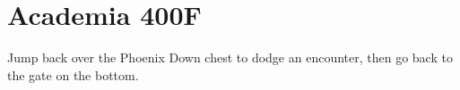 \chapter{Academia 400F}
Jump back over the Phoenix Down chest to dodge an encounter, then go back to the gate on the bottom.
\newline